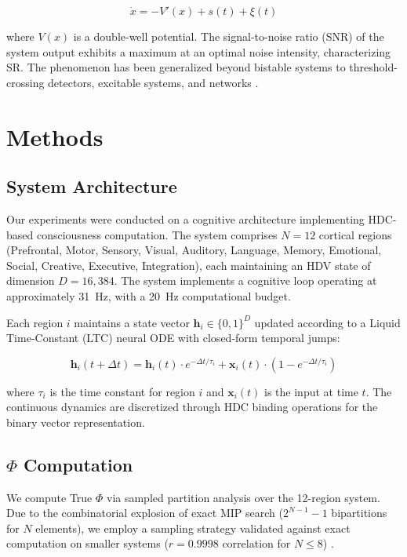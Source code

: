 \documentclass[12pt,a4paper]{article}
\begin{document}
\begin{equation}
\dot{x} = -V'(x) + s(t) + \xi(t)
\end{equation}

where $V(x)$ is a double-well potential. The signal-to-noise ratio (SNR) of the system output exhibits a maximum at an optimal noise intensity, characterizing SR. The phenomenon has been generalized beyond bistable systems to threshold-crossing detectors, excitable systems, and networks \citep{mcdonnell2011benefits}.

\section{Methods}

\subsection{System Architecture}

Our experiments were conducted on a cognitive architecture implementing HDC-based consciousness computation. The system comprises $N = 12$ cortical regions (Prefrontal, Motor, Sensory, Visual, Auditory, Language, Memory, Emotional, Social, Creative, Executive, Integration), each maintaining an HDV state of dimension $D = 16{,}384$. The system implements a cognitive loop operating at approximately 31~Hz, with a 20~Hz computational budget.

Each region $i$ maintains a state vector $\mathbf{h}_i \in \{0, 1\}^D$ updated according to a Liquid Time-Constant (LTC) neural ODE with closed-form temporal jumps:

\begin{equation}
\mathbf{h}_i(t + \Delta t) = \mathbf{h}_i(t) \cdot e^{-\Delta t / \tau_i} + \mathbf{x}_i(t) \cdot (1 - e^{-\Delta t / \tau_i})
\end{equation}

where $\tau_i$ is the time constant for region $i$ and $\mathbf{x}_i(t)$ is the input at time $t$. The continuous dynamics are discretized through HDC binding operations for the binary vector representation.

\subsection{$\Phi$ Computation}

We compute True $\Phi$ via sampled partition analysis over the 12-region system. Due to the combinatorial explosion of exact MIP search ($2^{N-1} - 1$ bipartitions for $N$ elements), we employ a sampling strategy validated against exact computation on smaller systems ($r = 0.9998$ correlation for $N \leq 8$) \citep{barrett2011practical}.
\end{document}
